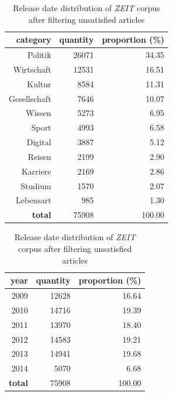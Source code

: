 \begin{table}[!ht]
\begin{minipage}[b]{.45\linewidth}
\centering
\begin{tabular}{rrr}
\hline
\textbf{category} &   \textbf{quantity} &   \textbf{proportion (\%)} \\
\hline
Politik      &      26071 &            34.35 \\
Wirtschaft   &      12531 &            16.51 \\
Kultur       &       8584 &            11.31 \\
Gesellschaft &       7646 &            10.07 \\
Wissen       &       5273 &             6.95 \\
Sport        &       4993 &             6.58 \\
Digital      &       3887 &             5.12 \\
Reisen       &       2199 &             2.90 \\
Karriere     &       2169 &             2.86 \\
Studium      &       1570 &             2.07 \\
Lebensart    &        985 &             1.30 \\
\hline
\textbf{total}        &      75908 &           100.00 \\
\hline
\end{tabular}
\caption{Category distribution of \textit{ZEIT} corpus after filtering unsatisfied articles}
\label{tab:cate_dist_new}

\end{minipage}
\begin{minipage}[b]{.45\linewidth}
\centering
\begin{tabular}{rrr}
\hline
\textbf{year} &   \textbf{quantity} &   \textbf{proportion (\%)} \\
\hline
2009 & 12628 &            16.64 \\
2010 & 14716 &            19.39 \\
2011 & 13970 &            18.40 \\
2012 & 14583 &            19.21 \\
2013 & 14941 &            19.68 \\
2014 &  5070 &             6.68 \\
\hline
\textbf{total} & 75908 &           100.00 \\
\hline
\end{tabular}
\caption{Release date distribution of \textit{ZEIT} corpus after filtering unsatisfied articles}
\label{tab:release_dist_new}
\end{minipage}
\end{table}


